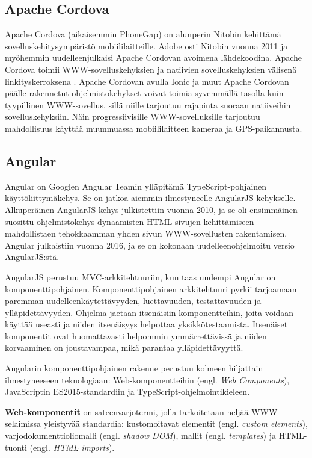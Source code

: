 \documentclass[utf8]{gradu3}
\begin{document}
\subsection{Apache Cordova}

Apache Cordova (aikaisemmin PhoneGap) on alunperin Nitobin kehittämä sovelluskehitysympäristö mobiililaitteille. Adobe osti Nitobin vuonna 2011 ja myöhemmin uudelleenjulkaisi Apache Cordovan avoimena lähdekoodina. Apache Cordova toimii WWW\nobreakdash-\hspace{0pt}sovelluskehyksien ja natiivien sovelluskehyksien välisenä linkityskerroksena \parencite[]{ionic-framework-hybrid}. Apache Cordovan avulla Ionic ja muut Apache Cordovan päälle rakennetut ohjelmistokehykset voivat toimia syvemmällä tasolla kuin tyypillinen WWW-sovellus, sillä niille tarjoutuu rajapinta suoraan natiiveihin sovelluskehyksiin. Näin progressiivisille WWW-sovelluksille tarjoutuu mahdollisuus käyttää muunmuassa mobiililaitteen kameraa ja GPS-paikannusta.

\subsection{Angular}

Angular on Googlen Angular Teamin ylläpitämä TypeScript-pohjainen käyttöliittymäkehys. Se on jatkoa aiemmin ilmestyneelle AngularJS-kehykselle. Alkuperäinen AngularJS-kehys julkistettiin vuonna 2010, ja se oli ensimmäinen suosittu ohjelmistokehys dynaamisten HTML-sivujen kehittämiseen mahdollistaen tehokkaamman yhden sivun WWW-sovellusten rakentamisen. Angular julkaistiin vuonna 2016, ja se on kokonaan uudelleenohjelmoitu versio AngularJS:stä.

AngularJS perustuu MVC-arkkitehtuuriin, kun taas uudempi Angular on komponenttipohjainen. Komponenttipohjainen arkkitehtuuri pyrkii tarjoamaan paremman uudelleenkäytettävyyden, luettavuuden, testattavuuden ja ylläpidettävyyden. Ohjelma jaetaan itsenäisiin komponentteihin, joita voidaan käyttää useasti ja niiden itsenäisyys helpottaa yksikkötestaamista. Itsenäiset komponentit ovat huomattavasti helpommin ymmärrettävissä ja niiden korvaaminen on joustavampaa, mikä parantaa ylläpidettävyyttä. \parencite[]{good-and-bad-angular} 

Angularin komponenttipohjainen rakenne perustuu kolmeen hiljattain ilmestyneeseen teknologiaan: Web-komponentteihin (engl. \textit{Web Components}), JavaScriptin ES2015-standardiin ja TypeScript-ohjelmointikieleen.

\textbf{Web-komponentit} on sateenvarjotermi, jolla tarkoitetaan neljää WWW-selaimissa yleistyvää standardia: kustomoitavat elementit (engl. \textit{custom elements}), varjodokumenttioliomalli (engl. \textit{shadow DOM}), mallit (engl. \textit{templates}) ja HTML-tuonti (engl. \textit{HTML imports}). 
\end{document}
